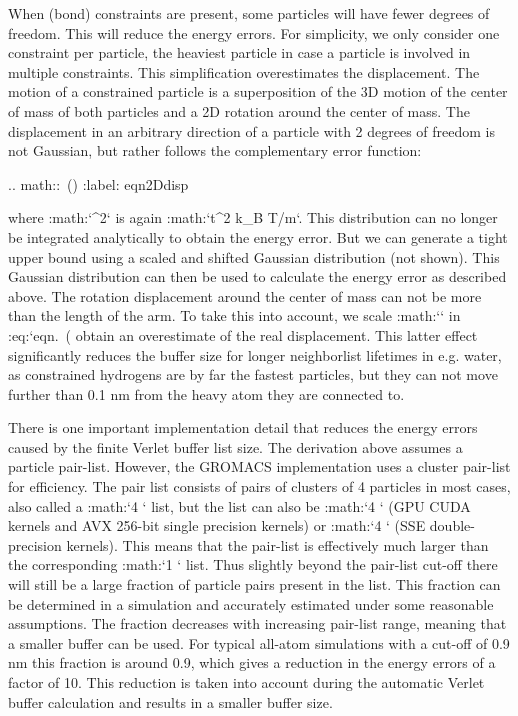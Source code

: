 When (bond) constraints are present, some particles will have fewer
degrees of freedom. This will reduce the energy errors. For simplicity,
we only consider one constraint per particle, the heaviest particle in
case a particle is involved in multiple constraints. This simplification
overestimates the displacement. The motion of a constrained particle is
a superposition of the 3D motion of the center of mass of both particles
and a 2D rotation around the center of mass. The displacement in an
arbitrary direction of a particle with 2 degrees of freedom is not
Gaussian, but rather follows the complementary error function:

.. math:: \,\left(\right)
          :label: eqn2Ddisp

where :math:`\sigma^2` is again :math:`t^2 k_B T/m`. This distribution
can no longer be integrated analytically to obtain the energy error. But
we can generate a tight upper bound using a scaled and shifted Gaussian
distribution (not shown). This Gaussian distribution can then be used to
calculate the energy error as described above. The rotation displacement
around the center of mass can not be more than the length of the arm. To
take this into account, we scale :math:`\sigma` in
:eq:`eqn. (%
obtain an overestimate of the real displacement. This latter effect
significantly reduces the buffer size for longer neighborlist lifetimes
in e.g. water, as constrained hydrogens are by far the fastest
particles, but they can not move further than 0.1 nm from the heavy atom
they are connected to.

There is one important implementation detail that reduces the energy
errors caused by the finite Verlet buffer list size. The derivation
above assumes a particle pair-list. However, the GROMACS implementation
uses a cluster pair-list for efficiency. The pair list consists of pairs
of clusters of 4 particles in most cases, also called a
:math:`4 ` list, but the list can also be :math:`4 `
(GPU CUDA kernels and AVX 256-bit single precision kernels) or
:math:`4 ` (SSE double-precision kernels). This means that the
pair-list is effectively much larger than the corresponding
:math:`1 ` list. Thus slightly beyond the pair-list cut-off
there will still be a large fraction of particle pairs present in the
list. This fraction can be determined in a simulation and accurately
estimated under some reasonable assumptions. The fraction decreases with
increasing pair-list range, meaning that a smaller buffer can be used.
For typical all-atom simulations with a cut-off of 0.9 nm this fraction
is around 0.9, which gives a reduction in the energy errors of a factor
of 10. This reduction is taken into account during the automatic Verlet
buffer calculation and results in a smaller buffer size.

